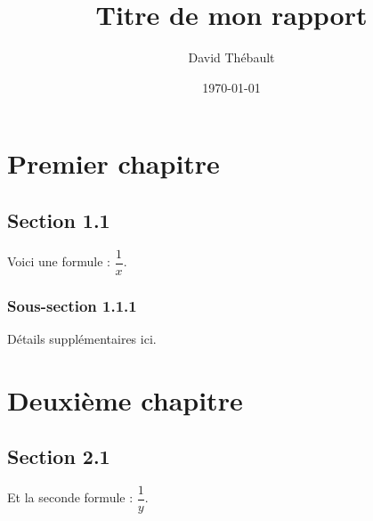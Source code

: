 \documentclass{report} %
\title{Titre de mon rapport}
\author{David Thébault}
\date{\today}
\begin{document}
\maketitle

\chapter{Premier chapitre}
\section{Section 1.1}
Voici une formule : \(\dfrac{1}{x}\).

\subsection{Sous-section 1.1.1}
Détails supplémentaires ici.

\chapter{Deuxième chapitre}
\section{Section 2.1}
Et la seconde formule : \(\dfrac{1}{y}\).
\end{document}
